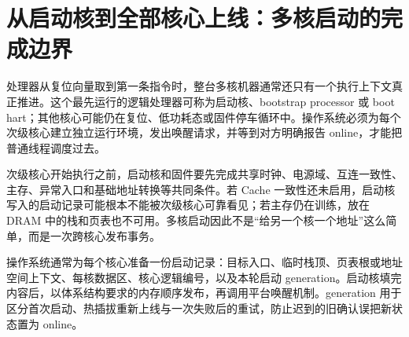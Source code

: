 \section{从启动核到全部核心上线：多核启动的完成边界}

处理器从复位向量取到第一条指令时，整台多核机器通常还只有一个执行上下文真正推进。这个最先运行的逻辑处理器可称为启动核、bootstrap processor 或 boot hart；其他核心可能仍在复位、低功耗态或固件停车循环中。操作系统必须为每个次级核心建立独立运行环境，发出唤醒请求，并等到对方明确报告 online，才能把普通线程调度过去。


次级核心开始执行之前，启动核和固件要先完成共享时钟、电源域、互连一致性、主存、异常入口和基础地址转换等共同条件。若 Cache 一致性还未启用，启动核写入的启动记录可能根本不能被次级核心可靠看见；若主存仍在训练，放在 DRAM 中的栈和页表也不可用。多核启动因此不是“给另一个核一个地址”这么简单，而是一次跨核心发布事务。

操作系统通常为每个核心准备一份启动记录：目标入口、临时栈顶、页表根或地址空间上下文、每核数据区、核心逻辑编号，以及本轮启动 generation。启动核填完内容后，以体系结构要求的内存顺序发布，再调用平台唤醒机制。generation 用于区分首次启动、热插拔重新上线与一次失败后的重试，防止迟到的旧确认误把新状态置为 online。

